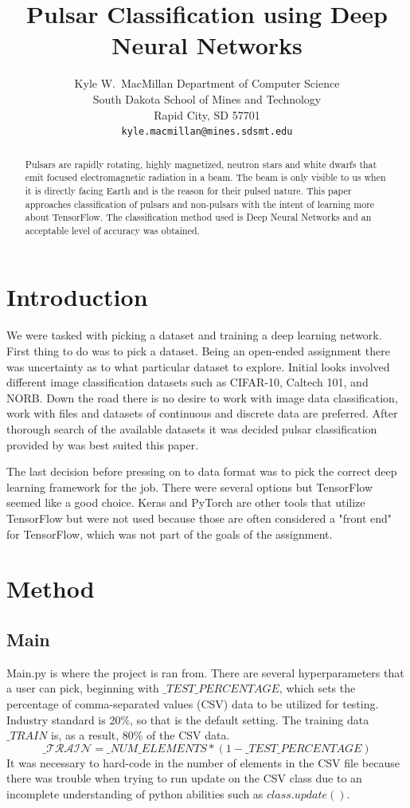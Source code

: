 \documentclass{article}
\title{Pulsar Classification using Deep Neural Networks}
\author{
    Kyle W.~MacMillan
    Department of Computer Science\\
    South Dakota School of Mines and Technology\\
    Rapid City, SD 57701 \\
    \texttt{kyle.macmillan@mines.sdsmt.edu} \\
}
\begin{document}
\maketitle

\begin{abstract}
    Pulsars are rapidly rotating, highly magnetized, neutron stars and white 
    dwarfs that emit focused electromagnetic radiation in a beam. The beam is 
    only visible to us when it is directly facing Earth and is the reason for 
    their pulsed nature. This paper approaches classification of pulsars and 
    non-pulsars with the intent of learning more about TensorFlow. The 
    classification method used is Deep Neural Networks and an acceptable level 
    of accuracy was obtained.
\end{abstract}

\section{Introduction}
    We were tasked with picking a dataset and training a deep learning network. 
    First thing to do was to pick a dataset. Being an open-ended assignment 
    there was uncertainty as to what particular dataset to explore. Initial 
    looks involved different image classification datasets such as CIFAR-10, 
    Caltech 101, and NORB. Down the road there is no desire to work with image 
    data classification, work with files and datasets of continuous and 
    discrete data are preferred. After thorough search of the available 
    datasets it was decided pulsar classification provided by 
    \citet{orig_pulsar} was best suited this paper. 

    The last decision before pressing on to data format was to pick the correct 
    deep learning framework for the job. There were several options but 
    TensorFlow seemed like a good choice. Keras and PyTorch are other tools 
    that utilize TensorFlow but were not used because those are often 
    considered a "front end" for TensorFlow, which was not part of the goals of 
    the assignment.

\section{Method}

\subsection{Main}
    Main.py is where the project is ran from. There are several hyperparameters 
    that a user can pick, beginning with $\_TEST\_PERCENTAGE$, which sets the 
    percentage of comma-separated values (CSV) data to be utilized for testing. 
    Industry standard is 20\%, so that is the default setting. The training 
    data $\_TRAIN$ is, as a result, 80\% of the CSV data. 
    \[\mathcal{\_TRAIN}=\_NUM\_ELEMENTS * ( 1 - \_TEST\_PERCENTAGE )\]
    It was necessary to hard-code in the number of elements in the CSV file 
    because there was trouble when trying to run update on the CSV class due to 
    an incomplete understanding of python abilities such as $class.update()$.
\end{document}
